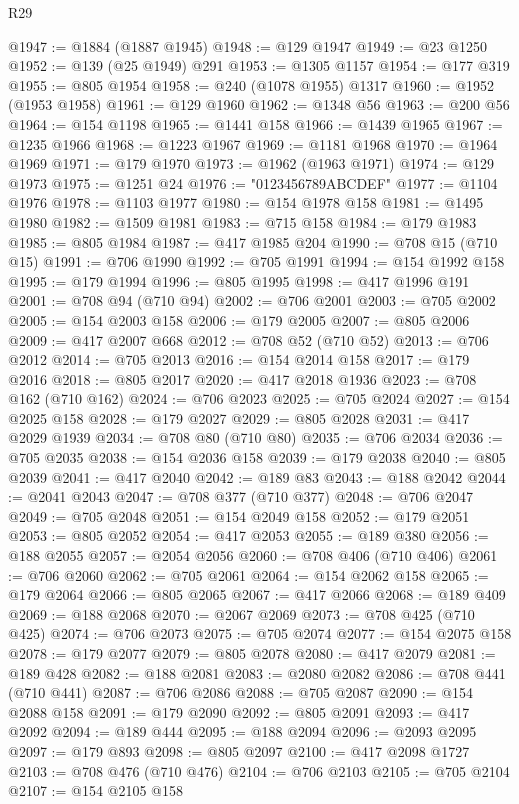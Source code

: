 \begin{lexlean}{R29}
\begin{coremodule}
@1947 := @1884 (@1887 @1945)
@1948 := @129 @1947
@1949 := @23 @1250
@1952 := @139 (@25 @1949) @291
@1953 := @1305 @1157
@1954 := @177 @319
@1955 := @805 @1954
@1958 := @240 (@1078 @1955) @1317
@1960 := @1952 (@1953 @1958)
@1961 := @129 @1960
@1962 := @1348 @56
@1963 := @200 @56
@1964 := @154 @1198
@1965 := @1441 @158
@1966 := @1439 @1965
@1967 := @1235 @1966
@1968 := @1223 @1967
@1969 := @1181 @1968
@1970 := @1964 @1969
@1971 := @179 @1970
@1973 := @1962 (@1963 @1971)
@1974 := @129 @1973
@1975 := @1251 @24
@1976 := "0123456789ABCDEF"
@1977 := @1104 @1976
@1978 := @1103 @1977
@1980 := @154 @1978 @158
@1981 := @1495 @1980
@1982 := @1509 @1981
@1983 := @715 @158
@1984 := @179 @1983
@1985 := @805 @1984
@1987 := @417 @1985 @204
@1990 := @708 @15 (@710 @15)
@1991 := @706 @1990
@1992 := @705 @1991
@1994 := @154 @1992 @158
@1995 := @179 @1994
@1996 := @805 @1995
@1998 := @417 @1996 @191
@2001 := @708 @94 (@710 @94)
@2002 := @706 @2001
@2003 := @705 @2002
@2005 := @154 @2003 @158
@2006 := @179 @2005
@2007 := @805 @2006
@2009 := @417 @2007 @668
@2012 := @708 @52 (@710 @52)
@2013 := @706 @2012
@2014 := @705 @2013
@2016 := @154 @2014 @158
@2017 := @179 @2016
@2018 := @805 @2017
@2020 := @417 @2018 @1936
@2023 := @708 @162 (@710 @162)
@2024 := @706 @2023
@2025 := @705 @2024
@2027 := @154 @2025 @158
@2028 := @179 @2027
@2029 := @805 @2028
@2031 := @417 @2029 @1939
@2034 := @708 @80 (@710 @80)
@2035 := @706 @2034
@2036 := @705 @2035
@2038 := @154 @2036 @158
@2039 := @179 @2038
@2040 := @805 @2039
@2041 := @417 @2040
@2042 := @189 @83
@2043 := @188 @2042
@2044 := @2041 @2043
@2047 := @708 @377 (@710 @377)
@2048 := @706 @2047
@2049 := @705 @2048
@2051 := @154 @2049 @158
@2052 := @179 @2051
@2053 := @805 @2052
@2054 := @417 @2053
@2055 := @189 @380
@2056 := @188 @2055
@2057 := @2054 @2056
@2060 := @708 @406 (@710 @406)
@2061 := @706 @2060
@2062 := @705 @2061
@2064 := @154 @2062 @158
@2065 := @179 @2064
@2066 := @805 @2065
@2067 := @417 @2066
@2068 := @189 @409
@2069 := @188 @2068
@2070 := @2067 @2069
@2073 := @708 @425 (@710 @425)
@2074 := @706 @2073
@2075 := @705 @2074
@2077 := @154 @2075 @158
@2078 := @179 @2077
@2079 := @805 @2078
@2080 := @417 @2079
@2081 := @189 @428
@2082 := @188 @2081
@2083 := @2080 @2082
@2086 := @708 @441 (@710 @441)
@2087 := @706 @2086
@2088 := @705 @2087
@2090 := @154 @2088 @158
@2091 := @179 @2090
@2092 := @805 @2091
@2093 := @417 @2092
@2094 := @189 @444
@2095 := @188 @2094
@2096 := @2093 @2095
@2097 := @179 @893
@2098 := @805 @2097
@2100 := @417 @2098 @1727
@2103 := @708 @476 (@710 @476)
@2104 := @706 @2103
@2105 := @705 @2104
@2107 := @154 @2105 @158

\end{coremodule}
\end{lexlean}
